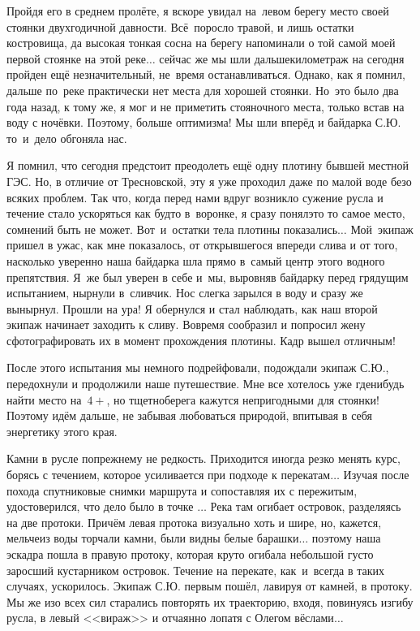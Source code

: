 Пройдя его в среднем пролёте, я вскоре увидал на~левом берегу место своей стоянки двухгодичной давности. Всё~поросло травой, и лишь остатки костровища, да высокая тонкая сосна на берегу напоминали о той самой моей первой стоянке на этой реке$\ldots$ сейчас же мы шли дальше\mdash километраж на сегодня пройден ещё незначительный, не~время останавливаться. Однако, как я помнил, дальше по~реке практически нет места для хорошей стоянки. Но~это было два года назад, к тому же, я мог и не приметить стояночного места, только встав на воду с ночёвки. Поэтому, больше оптимизма! Мы шли вперёд и байдарка С.Ю. то~и~дело обгоняла нас. 

Я помнил, что сегодня предстоит преодолеть ещё одну плотину бывшей местной ГЭС. Но, в отличие от Тресновской, эту я уже проходил даже по малой воде безо всяких проблем. Так что, когда перед нами вдруг возникло сужение русла и течение стало ускоряться как будто в~воронке, я сразу понял\mdash это то самое место, сомнений быть не может. Вот~и~остатки тела плотины показались$\ldots$ Мой~экипаж пришел в ужас, как мне показалось, от открывшегося впереди слива и от того, насколько уверенно наша байдарка шла прямо в~самый центр этого водного препятствия. Я~же был уверен в себе и~мы, выровняв байдарку перед грядущим испытанием, нырнули в~сливчик. Нос слегка зарылся в воду и сразу же вынырнул. Прошли на ура! Я обернулся и стал наблюдать, как наш второй экипаж начинает заходить к сливу. Вовремя сообразил и попросил жену сфотографировать их в момент прохождения плотины. Кадр вышел отличным!

После этого испытания мы немного подрейфовали, подождали экипаж С.Ю., передохнули и продолжили наше путешествие. Мне все хотелось уже где\sdash нибудь найти место на~$4+$, но тщетно\mdash берега кажутся непригодными для стоянки! Поэтому идём дальше, не забывая любоваться природой, впитывая в себя энергетику этого края.

Камни в русле по\sdash прежнему не редкость. Приходится иногда резко менять курс, борясь с течением, которое усиливается при подходе к перекатам$\ldots$ Изучая после похода спутниковые снимки маршрута и сопоставляя их с пережитым, удостоверился, что дело было в точке \CoordsLidRightProtoka$\ldots$ Река там огибает островок, разделяясь на две протоки. Причём левая протока визуально хоть и шире, но, кажется, мельче\mdash из воды торчали камни, были видны белые барашки$\ldots$ поэтому наша эскадра пошла в правую протоку, которая круто огибала небольшой густо заросший кустарником островок. Течение на перекате, как~и~всегда в таких случаях, ускорилось. Экипаж С.Ю. первым пошёл, лавируя от камней, в протоку. Мы же изо всех сил старались повторять их траекторию, входя, повинуясь изгибу русла, в левый <<вираж>> и отчаянно лопатя с Олегом вёслами$\ldots$ 


